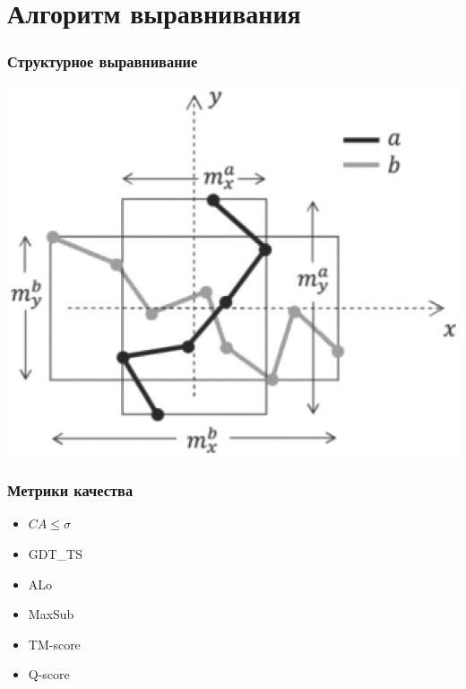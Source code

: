 \documentclass{beamer}
\begin{document}
\section{Алгоритм выравнивания}
\begin{frame}
\frametitle{Структурное выравнивание}
\begin{center}
\includegraphics[scale=0.15]{../pictures/btp530f1.jpeg}
\end{center}
\end{frame}

\begin{frame}
\frametitle{Метрики качества}
\begin{itemize}
\item $CA \leq \sigma$
\pause
\vfill
\item GDT\_TS
\pause
\vfill
\item ALo
\pause
\vfill
\item MaxSub
\pause
\vfill
\item TM-score
\pause
\vfill
\item Q-score
\end{itemize}
\end{frame}
\end{document}
